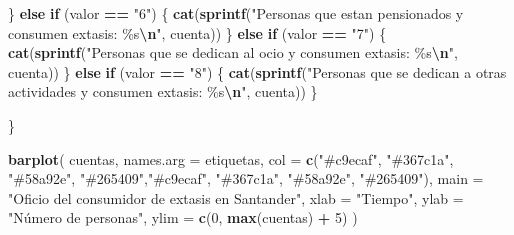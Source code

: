 \documentclass[
]{article}
\newenvironment{Shaded}{\begin{snugshade}}{\end{snugshade}}
\newcommand{\AttributeTok}[1]{\textcolor[rgb]{0.13,0.29,0.53}{#1}}
\newcommand{\ControlFlowTok}[1]{\textcolor[rgb]{0.13,0.29,0.53}{\textbf{#1}}}
\newcommand{\DecValTok}[1]{\textcolor[rgb]{0.00,0.00,0.81}{#1}}
\newcommand{\FunctionTok}[1]{\textcolor[rgb]{0.13,0.29,0.53}{\textbf{#1}}}
\newcommand{\NormalTok}[1]{#1}
\newcommand{\SpecialCharTok}[1]{\textcolor[rgb]{0.81,0.36,0.00}{\textbf{#1}}}
\newcommand{\StringTok}[1]{\textcolor[rgb]{0.31,0.60,0.02}{#1}}
\begin{document}
\begin{Shaded}
\begin{Highlighting}[]
\NormalTok{  \} }\ControlFlowTok{else} \ControlFlowTok{if}\NormalTok{ (valor }\SpecialCharTok{==} \StringTok{"6"}\NormalTok{) \{}
    \FunctionTok{cat}\NormalTok{(}\FunctionTok{sprintf}\NormalTok{(}\StringTok{"Personas que estan pensionados y consumen extasis: \%s}\SpecialCharTok{\textbackslash{}n}\StringTok{"}\NormalTok{, cuenta))}
\NormalTok{  \} }\ControlFlowTok{else} \ControlFlowTok{if}\NormalTok{ (valor }\SpecialCharTok{==} \StringTok{"7"}\NormalTok{) \{}
    \FunctionTok{cat}\NormalTok{(}\FunctionTok{sprintf}\NormalTok{(}\StringTok{"Personas que se dedican al ocio y consumen extasis: \%s}\SpecialCharTok{\textbackslash{}n}\StringTok{"}\NormalTok{, cuenta))}
\NormalTok{  \} }\ControlFlowTok{else} \ControlFlowTok{if}\NormalTok{ (valor }\SpecialCharTok{==} \StringTok{"8"}\NormalTok{) \{}
    \FunctionTok{cat}\NormalTok{(}\FunctionTok{sprintf}\NormalTok{(}\StringTok{"Personas que se dedican a otras actividades y consumen extasis: \%s}\SpecialCharTok{\textbackslash{}n}\StringTok{"}\NormalTok{, cuenta))}
\NormalTok{  \}}
  
\NormalTok{\}}

\FunctionTok{barplot}\NormalTok{(}
\NormalTok{  cuentas,}
  \AttributeTok{names.arg =}\NormalTok{ etiquetas,}
  \AttributeTok{col =} \FunctionTok{c}\NormalTok{(}\StringTok{"\#c9ecaf"}\NormalTok{, }\StringTok{"\#367c1a"}\NormalTok{, }\StringTok{"\#58a92e"}\NormalTok{, }\StringTok{"\#265409"}\NormalTok{,}\StringTok{"\#c9ecaf"}\NormalTok{, }\StringTok{"\#367c1a"}\NormalTok{, }\StringTok{"\#58a92e"}\NormalTok{, }\StringTok{"\#265409"}\NormalTok{),}
  \AttributeTok{main =} \StringTok{"Oficio del consumidor de extasis en Santander"}\NormalTok{,}
  \AttributeTok{xlab =} \StringTok{"Tiempo"}\NormalTok{,}
  \AttributeTok{ylab =} \StringTok{"Número de personas"}\NormalTok{,}
  \AttributeTok{ylim =} \FunctionTok{c}\NormalTok{(}\DecValTok{0}\NormalTok{, }\FunctionTok{max}\NormalTok{(cuentas) }\SpecialCharTok{+} \DecValTok{5}\NormalTok{)}
\NormalTok{)}


\end{Highlighting}
\end{Shaded}
\end{document}
